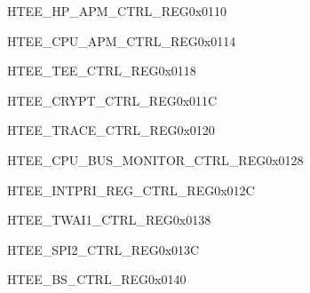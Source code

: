 \begin{register}{H}{TEE\_HP\_APM\_CTRL\_REG}{0x0110}\label{regdesc:TEEHPAPMCTRLREG}
\end{register}\vspace{-3em}

\begin{register}{H}{TEE\_CPU\_APM\_CTRL\_REG}{0x0114}\label{regdesc:TEECPUAPMCTRLREG}
\end{register}\vspace{-3em}

\begin{register}{H}{TEE\_TEE\_CTRL\_REG}{0x0118}\label{regdesc:TEETEECTRLREG}
\end{register}\vspace{-3em}

\begin{register}{H}{TEE\_CRYPT\_CTRL\_REG}{0x011C}\label{regdesc:TEECRYPTCTRLREG}
\end{register}\vspace{-3em}

\begin{register}{H}{TEE\_TRACE\_CTRL\_REG}{0x0120}\label{regdesc:TEETRACECTRLREG}
\end{register}\vspace{-3em}

\begin{register}{H}{TEE\_CPU\_BUS\_MONITOR\_CTRL\_REG}{0x0128}\label{regdesc:TEECPUBUSMONITORCTRLREG}
\end{register}\vspace{-3em}

\begin{register}{H}{TEE\_INTPRI\_REG\_CTRL\_REG}{0x012C}\label{regdesc:TEEINTPRIREGCTRLREG}
\end{register}\vspace{-3em}

\begin{register}{H}{TEE\_TWAI1\_CTRL\_REG}{0x0138}\label{regdesc:TEETWAI1CTRLREG}
\end{register}\vspace{-3em}

\begin{register}{H}{TEE\_SPI2\_CTRL\_REG}{0x013C}\label{regdesc:TEESPI2CTRLREG}
\end{register}\vspace{-3em}

\begin{register}{H}{TEE\_BS\_CTRL\_REG}{0x0140}\label{regdesc:TEEBSCTRLREG}
\end{register}\vspace{-3em}


